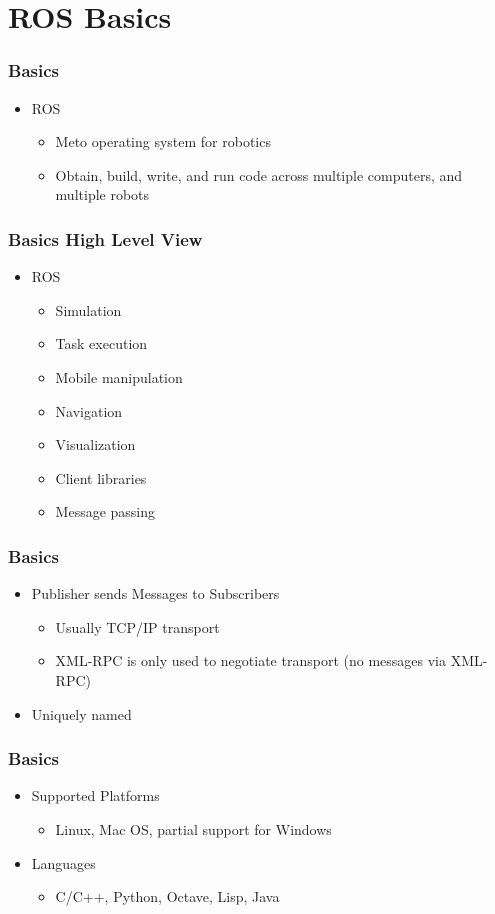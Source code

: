 \documentclass[t]{beamer}
\begin{document}
\section{ROS Basics}

\begin{frame}
\frametitle{Basics}
\begin{itemize}
  \item ROS
  \begin{itemize}
    \item Meto operating system for robotics
    \item Obtain, build, write, and run code across multiple computers, and
    multiple robots
  \end{itemize}
\end{itemize}
\end{frame}

\begin{frame}
\frametitle{Basics High Level View}
\begin{itemize}
  \item ROS
  \begin{itemize}
    \item Simulation
    \item Task execution
    \item Mobile manipulation
    \item Navigation
    \item Visualization
    \item Client libraries
    \item Message passing
  \end{itemize}
\end{itemize}
\end{frame}

\begin{frame}
\frametitle{Basics}
\begin{itemize}
  \item Publisher sends Messages to Subscribers
  \begin{itemize}
    \item Usually TCP/IP transport
    \item XML-RPC is only used to negotiate transport (no messages via XML-RPC)
  \end{itemize}
  \item Uniquely named
\end{itemize}
\end{frame}

\begin{frame}
\frametitle{Basics}
\begin{itemize}
  \item Supported Platforms
  \begin{itemize}
    \item Linux, Mac OS, partial support for Windows
  \end{itemize}
  \item Languages
  \begin{itemize}
    \item C/C++, Python, Octave, Lisp, Java
  \end{itemize}

\end{itemize}
\end{frame}
\end{document}
